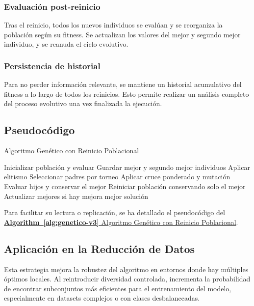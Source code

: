 \subsubsection{Evaluación post-reinicio}
Tras el reinicio, todos los nuevos individuos se evalúan y se reorganiza la población según su fitness.
Se actualizan los valores del mejor y segundo mejor individuo, y se reanuda el ciclo evolutivo.

\subsubsection{Persistencia de historial}
Para no perder información relevante, se mantiene un historial acumulativo del fitness a lo largo de todos los reinicios.
Esto permite realizar un análisis completo del proceso evolutivo una vez finalizada la ejecución.



\subsection{Pseudocódigo}\label{subsec:Pseudocodigo-genetico-v3}
\begin{algorithm}[htp]
      \caption{Algoritmo Genético con Reinicio Poblacional}
      \label{alg:genetico-v3}
      \begin{algorithmic}[1]
            \State Inicializar población y evaluar
            \State Guardar mejor y segundo mejor individuos
            \State Aplicar elitismo
            \State Seleccionar padres por torneo
            \State Aplicar cruce ponderado y mutación
            \State Evaluar hijos y conservar el mejor
            \EndWhile
            \State Reiniciar población conservando solo el mejor
            \EndIf
            \State Actualizar mejores si hay mejora
            \EndWhile
            \State \Return mejor solución
      \end{algorithmic}
\end{algorithm}

Para facilitar su lectura o replicación, se ha detallado el pseudocódigo del \hyperref[alg:genetico-v3]{\textbf{Algorithm~\ref*{alg:genetico-v3}} Algoritmo Genético con Reinicio Poblacional}.

\subsection{Aplicación en la Reducción de Datos}\label{subsec:aplicacion-en-la-reduccion-de-datos-genetico-v3}
Esta estrategia mejora la robustez del algoritmo en entornos donde hay múltiples óptimos locales.
Al reintroducir diversidad controlada, incrementa la probabilidad de encontrar subconjuntos más eficientes para el entrenamiento del modelo,
especialmente en datasets complejos o con clases desbalanceadas.


